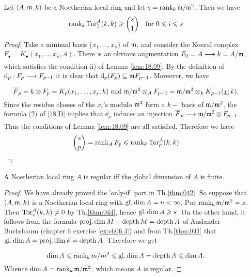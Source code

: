 \documentclass[../main]{subfiles}
\begin{document}
\begin{partheorem}\label{thm:044} Let $(A, \mathfrak{m}, k)$ be a Noetherian local ring and let \newline $s=\operatorname{rank}_{k} \mathfrak{m}/\mathfrak{m}^2$. Then we have
\[
\operatorname{rank}_k \operatorname{Tor}_1^A(k,k)\geqslant \binom{s}{1} \quad \text{for } 0\leqslant i \leqslant s
\]
\end{partheorem}
\begin{proof}
Take a minimal basis $\{x_{1}, \dots, x_{s}\}$ of $\mathfrak{m}$, and consider the Koszul complex $F_\bullet=K_\bullet(x_{1}, \dots, x_{s}, A)$. There is an obvious augmentation $F_{0}=A \varrightarrow{} k=A / \ideal{m}$, which satisfies the condition ii) of Lemma \ref{lem:18.09}. By the definition of\newline  $\dd_{p}: F_{p} \varrightarrow{} F_{p-1}$ it is clear that $\mathrm{d}_{p}(F_{p}) \subseteq \mathfrak{m}F_{p-1}$. Moreover, we have \[\overline{F}_{p}=k \otimes F_{p}= K_p(x_1,\dots ,x_s; k)\text{ and } \mathfrak{m}/\mathfrak{m}^2 \otimes_A F_{p-1} =\mathfrak{m}/\mathfrak{m}^2\otimes_k K_{p-1}(\underline{x};k).\]
Since the residue classes of the $x_{i}$'s modulo $\mathfrak{m}^{2}$ form a $k-$ basis of $\mathfrak{m} / \mathfrak{m}^{2}$, the formula (2) of \ref{18.D} implies that $\dd_{p}$ induces an injection $\overline{F}_{p} \varrightarrow{} \ideal{m} / \ideal{m}^{2} \otimes F_{p-1}$. Thus the conditions of Lemma \ref{lem:18.09} are all satisfied. Therefore we have
\[\binom{s}{p} = \operatorname{rank}_A F_p \leqslant \operatorname{rank}_k \operatorname{Tor}_p^A(k,k)\]
\end{proof}
\begin{partheorem}\label{thm:045}
A Noetherian local ring $A$ is regular iff the global dimension of $A$ is finite.
\end{partheorem}
\begin{proof}
We have already proved the 'only-if' part in Th.\ref{thm:042}. So suppose that $(A, \mathfrak{m}, k)$ is a Noetherian local ring with $\operatorname{gl. dim} A=n<\infty$. Put $\operatorname{rank}_{k} \mathfrak{m}/ \mathfrak{m}^{2}=s$. Then $\operatorname{Tor}_{s}^{A}(k, k) \neq 0$ by Th.\ref{thm:044}, hence  $\operatorname{gl. dim} A \geqslant s$. On the other hand, it follows from the formula $\operatorname{proj. dim} M +\operatorname{depth} M = \operatorname{depth} A $ of Auslander-Buchsbaum (chapter 6 exercise \ref{ex:ch06.4}) and from Th.\ref{thm:041} that $\operatorname{gl. dim} A = \operatorname{proj. dim} k = \operatorname{depth} A $. Therefore we get

\[\operatorname{dim} A \leqslant \operatorname{rank}_{k} m / m^{2} \leqslant \operatorname{gl. dim} A=\operatorname{depth} A \leqslant \operatorname{dim} A .\] Whence $\operatorname{dim} A=\operatorname{rank}_{k} \mathfrak{m} / \mathfrak{m}^{2}$, which means $A$ is regular.\end{proof}
\end{document}
